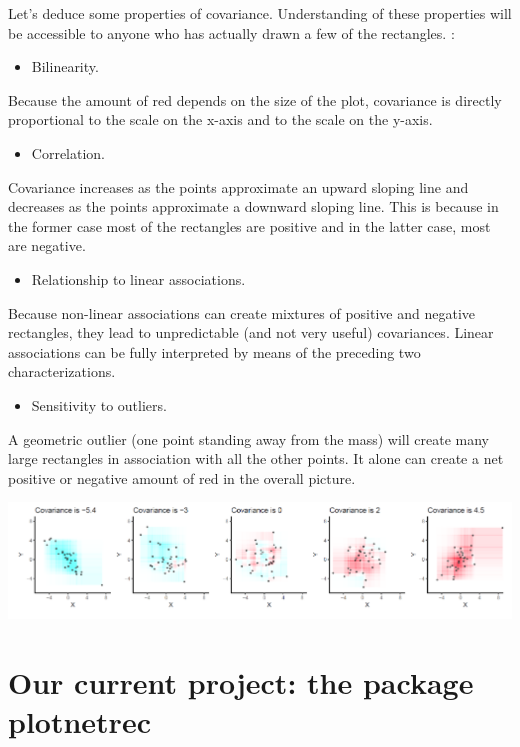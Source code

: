 \documentclass[
]{report}
\providecommand{\tightlist}{%
  \setlength{\itemsep}{0pt}\setlength{\parskip}{0pt}}
\begin{document}
Let's deduce some properties of covariance. Understanding of these properties will be accessible to anyone who has actually drawn a few of the rectangles. :

\begin{itemize}
\tightlist
\item
  Bilinearity.
\end{itemize}

Because the amount of red depends on the size of the plot, covariance is directly proportional to the scale on the x-axis and to the scale on the y-axis.

\begin{itemize}
\tightlist
\item
  Correlation.
\end{itemize}

Covariance increases as the points approximate an upward sloping line and decreases as the points approximate a downward sloping line. This is because in the former case most of the rectangles are positive and in the latter case, most are negative.

\begin{itemize}
\tightlist
\item
  Relationship to linear associations.
\end{itemize}

Because non-linear associations can create mixtures of positive and negative rectangles, they lead to unpredictable (and not very useful) covariances. Linear associations can be fully interpreted by means of the preceding two characterizations.

\begin{itemize}
\tightlist
\item
  Sensitivity to outliers.
\end{itemize}

A geometric outlier (one point standing away from the mass) will create many large rectangles in association with all the other points. It alone can create a net positive or negative amount of red in the overall picture.

\includegraphics[width=14.12in]{covRect}

\hypertarget{our-current-project-the-package-plotnetrec}{%
\section{Our current project: the package plotnetrec}\label{our-current-project-the-package-plotnetrec}}
\end{document}
